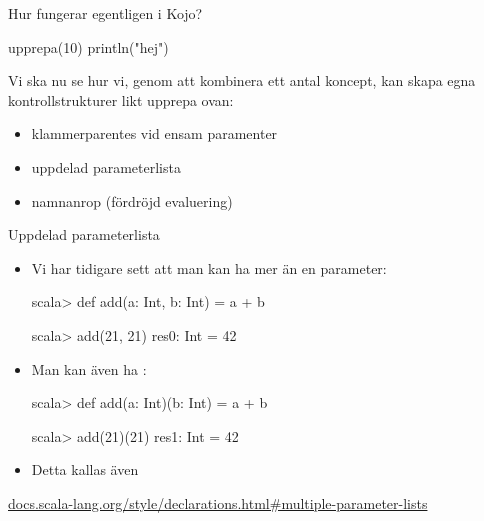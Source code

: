 \begin{Slide}{Hur fungerar egentligen  i Kojo?}
\begin{Code}[basicstyle=\ttfamily\SlideFontSize{14}{16}]
upprepa(10) {
  println("hej")
}
\end{Code}

\pause
Vi ska nu se hur vi, genom att kombinera ett antal koncept, kan skapa egna kontrollstrukturer likt upprepa ovan:
\begin{itemize}
\item klammerparentes vid ensam paramenter
\item uppdelad parameterlista
\item namnanrop (fördröjd evaluering)
\end{itemize}
\end{Slide}



\begin{Slide}{Uppdelad parameterlista}
\begin{itemize}
\item Vi har tidigare sett att man kan ha mer än en parameter:
\begin{REPLnonum}
scala> def add(a: Int, b: Int) = a + b

scala> add(21, 21)
res0: Int = 42
\end{REPLnonum}

\item Man kan även ha  :
\begin{REPLnonum}

scala> def add(a: Int)(b: Int) = a + b

scala> add(21)(21)
res1: Int = 42
\end{REPLnonum}
\item Detta kallas även  
\end{itemize}
\href{http://docs.scala-lang.org/style/declarations.html#multiple-parameter-lists}{\SlideFontTiny docs.scala-lang.org/style/declarations.html\#multiple-parameter-lists}
\end{Slide}



